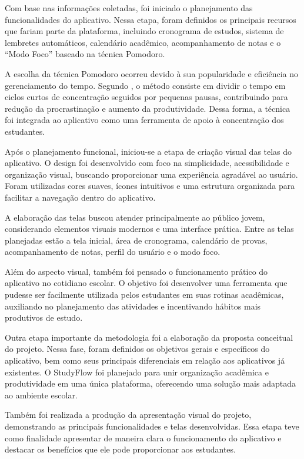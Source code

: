 \documentclass[12pt]{article}
\begin{document}
Com base nas informações coletadas, foi iniciado o planejamento das funcionalidades do aplicativo. Nessa etapa, foram definidos os principais recursos que fariam parte da plataforma, incluindo cronograma de estudos, sistema de lembretes automáticos, calendário acadêmico, acompanhamento de notas e o “Modo Foco” baseado na técnica Pomodoro.

A escolha da técnica Pomodoro ocorreu devido à sua popularidade e eficiência no gerenciamento do tempo. Segundo , o método consiste em dividir o tempo em ciclos curtos de concentração seguidos por pequenas pausas, contribuindo para redução da procrastinação e aumento da produtividade. Dessa forma, a técnica foi integrada ao aplicativo como uma ferramenta de apoio à concentração dos estudantes.

Após o planejamento funcional, iniciou-se a etapa de criação visual das telas do aplicativo. O design foi desenvolvido com foco na simplicidade, acessibilidade e organização visual, buscando proporcionar uma experiência agradável ao usuário. Foram utilizadas cores suaves, ícones intuitivos e uma estrutura organizada para facilitar a navegação dentro do aplicativo.

A elaboração das telas buscou atender principalmente ao público jovem, considerando elementos visuais modernos e uma interface prática. Entre as telas planejadas estão a tela inicial, área de cronograma, calendário de provas, acompanhamento de notas, perfil do usuário e o modo foco.

Além do aspecto visual, também foi pensado o funcionamento prático do aplicativo no cotidiano escolar. O objetivo foi desenvolver uma ferramenta que pudesse ser facilmente utilizada pelos estudantes em suas rotinas acadêmicas, auxiliando no planejamento das atividades e incentivando hábitos mais produtivos de estudo.

Outra etapa importante da metodologia foi a elaboração da proposta conceitual do projeto. Nessa fase, foram definidos os objetivos gerais e específicos do aplicativo, bem como seus principais diferenciais em relação aos aplicativos já existentes. O StudyFlow foi planejado para unir organização acadêmica e produtividade em uma única plataforma, oferecendo uma solução mais adaptada ao ambiente escolar.

Também foi realizada a produção da apresentação visual do projeto, demonstrando as principais funcionalidades e telas desenvolvidas. Essa etapa teve como finalidade apresentar de maneira clara o funcionamento do aplicativo e destacar os benefícios que ele pode proporcionar aos estudantes.
\end{document}
